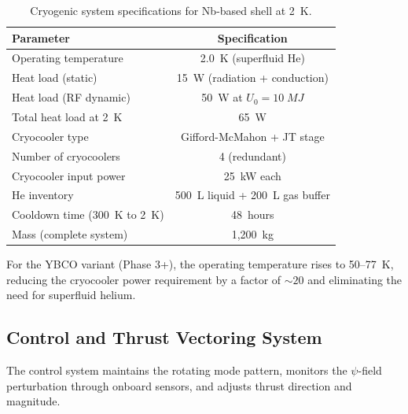 \documentclass[twocolumn,prl,superscriptaddress,nofootinbib,longbibliography,floatfix]{revtex4-2}
\begin{document}
\begin{table}[h]
\centering
\caption{Cryogenic system specifications for Nb-based shell at 2~K.}
\label{tab:cryo}
\begin{ruledtabular}
\begin{tabular}{lc}
Parameter & Specification \\
\hline
Operating temperature & 2.0~K (superfluid He) \\
Heat load (static) & 15~W (radiation + conduction) \\
Heat load (RF dynamic) & 50~W at $U_0 = 10\;\si{MJ}$ \\
Total heat load at 2~K & 65~W \\
Cryocooler type & Gifford-McMahon + JT stage \\
Number of cryocoolers & 4 (redundant) \\
Cryocooler input power & 25~kW each \\
He inventory & 500~L liquid + 200~L gas buffer \\
Cooldown time (300~K to 2~K) & 48~hours \\
Mass (complete system) & 1{,}200~kg \\
\end{tabular}
\end{ruledtabular}
\end{table}

For the YBCO variant (Phase 3+), the operating temperature rises to
50--77~K, reducing the cryocooler power requirement by a factor of
$\sim 20$ and eliminating the need for superfluid helium.

\subsection{Control and Thrust Vectoring System}

The control system maintains the rotating mode pattern, monitors the
$\psi$-field perturbation through onboard sensors, and adjusts thrust
direction and magnitude.
\end{document}
